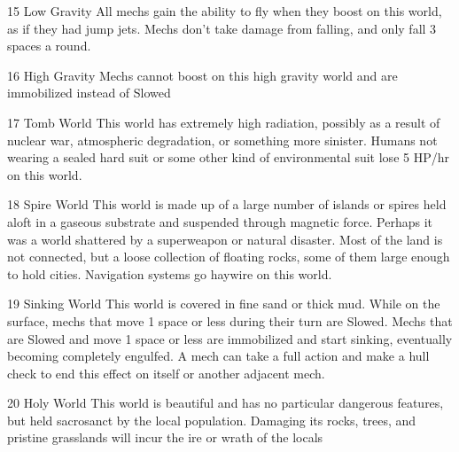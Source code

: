 15      Low Gravity                        All mechs gain the ability to fly when they boost on this
                                            world, as if they had jump jets. Mechs don't take
                                            damage from falling, and only fall 3 spaces a round.




 16      High Gravity                        Mechs cannot boost on this high gravity world and are
                                             immobilized instead of Slowed

 17      Tomb World                          This world has extremely high radiation, possibly as a
                                             result of nuclear war, atmospheric degradation, or
                                             something more sinister. Humans not wearing a sealed
                                             hard suit or some other kind of environmental suit lose
                                             5 HP/hr on this world.

 18      Spire World                         This world is made up of a large number of islands or
                                             spires held aloft in a gaseous substrate and suspended
                                             through magnetic force. Perhaps it was a world
                                             shattered by a superweapon or natural disaster. Most of
                                             the land is not connected, but a loose collection of
                                             floating rocks, some of them large enough to hold
                                             cities. Navigation systems go haywire on this world.

 19      Sinking World                       This world is covered in fine sand or thick mud. While
                                             on the surface, mechs that move 1 space or less during
                                             their turn are Slowed. Mechs that are Slowed and move
                                             1 space or less are immobilized and start sinking,
                                             eventually becoming completely engulfed. A mech can
                                             take a full action and make a hull check to end this
                                             effect on itself or another adjacent mech.

 20      Holy World                          This world is beautiful and has no particular dangerous
                                             features, but held sacrosanct by the local population.
                                             Damaging its rocks, trees, and pristine grasslands will
                                             incur the ire or wrath of the locals

